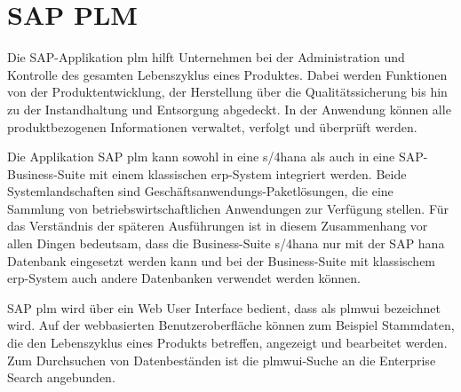 





\section{SAP PLM}


Die SAP-Applikation \acl{plm} hilft Unternehmen bei der Administration und Kontrolle des gesamten Lebenszyklus eines Produktes. Dabei werden Funktionen von der Produktentwicklung, der Herstellung über die Qualitätssicherung bis hin zu der Instandhaltung und Entsorgung abgedeckt. In der Anwendung können alle produktbezogenen Informationen verwaltet, verfolgt und überprüft werden.\autocite[Vgl.][S.232-236]{SAP01}

Die Applikation SAP \ac{plm} kann sowohl in eine \acl{s/4hana} als auch in eine SAP-Business-Suite mit einem klassischen \ac{erp}-System integriert werden. Beide Systemlandschaften sind Geschäftsanwendungs-Paketlösungen, die eine Sammlung von betriebswirtschaftlichen Anwendungen zur Verfügung stellen. Für das Verständnis der späteren Ausführungen ist in diesem Zusammenhang vor allen Dingen bedeutsam, dass die Business-Suite \acs{s/4hana} nur mit der SAP \ac{hana} Datenbank eingesetzt werden kann und bei der Business-Suite mit klassischem \ac{erp}-System auch andere Datenbanken verwendet werden können.\autocite[Vgl.][S.4]{SAPTEC}


\newpage
SAP \ac{plm} wird über ein Web User Interface bedient, dass als \ac{plmwui} bezeichnet wird. Auf der webbasierten Benutzeroberfläche können zum Beispiel Stammdaten, die den Lebenszyklus eines Produkts betreffen, angezeigt und bearbeitet werden. Zum Durchsuchen von Datenbeständen ist die \ac{plmwui}-Suche an die Enterprise Search angebunden.









